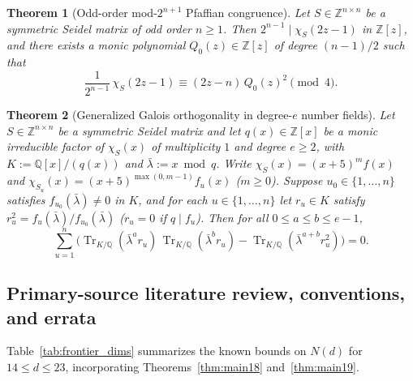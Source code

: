 \documentclass[11pt,reqno]{amsart}
\newtheorem{theorem}{Theorem}[section]
\theoremstyle{definition}
\theoremstyle{remark}
\numberwithin{equation}{section}
\numberwithin{table}{section}
\DeclareMathOperator{\Tr}{Tr}
\begin{document}
\begin{theorem}[Odd-order mod-$2^{n+1}$ Pfaffian congruence]\label{thm:pfaffian}
Let $S \in \mathbb{Z}^{n \times n}$ be a symmetric Seidel matrix of odd order $n \ge 1$. Then $2^{n-1} \mid \chi_S(2z - 1)$ in $\mathbb{Z}[z]$, and there exists a monic polynomial $Q_0(z) \in \mathbb{Z}[z]$ of degree $(n - 1)/2$ such that
\begin{equation}\label{eq:intro_pfaffian}
  \frac{1}{2^{n-1}}\,\chi_S(2z - 1) \equiv (2z - n)\,Q_0(z)^2 \pmod{4}.
\end{equation}
\end{theorem}

\begin{theorem}[Generalized Galois orthogonality in degree-$e$ number fields]\label{thm:galois_intro}
Let $S \in \mathbb{Z}^{n \times n}$ be a symmetric Seidel matrix and let $q(x) \in \mathbb{Z}[x]$ be a monic irreducible factor of $\chi_S(x)$ of multiplicity $1$ and degree $e \ge 2$, with $K := \mathbb{Q}[x]/(q(x))$ and $\bar{\lambda} := x \bmod q$. Write $\chi_S(x) = (x+5)^m f(x)$ and $\chi_{S_u}(x) = (x+5)^{\max(0, m-1)} f_u(x)$ ($m \ge 0$). Suppose $u_0 \in \{1, \dots, n\}$ satisfies $f_{u_0}(\bar{\lambda}) \neq 0$ in $K$, and for each $u \in \{1, \dots, n\}$ let $r_u \in K$ satisfy $r_u^2 = f_u(\bar{\lambda})/f_{u_0}(\bar{\lambda})$ ($r_u = 0$ if $q \mid f_u$). Then for all $0 \le a \le b \le e - 1$,
\begin{equation}\label{eq:intro_galois}
  \sum_{u=1}^n \Big(\Tr_{K/\mathbb{Q}}(\bar{\lambda}^a r_u)\,\Tr_{K/\mathbb{Q}}(\bar{\lambda}^b r_u) - \Tr_{K/\mathbb{Q}}(\bar{\lambda}^{a+b} r_u^2)\Big) = 0.
\end{equation}
\end{theorem}

\subsection{Primary-source literature review, conventions, and errata}\label{subsec:lit_review}
Table~\ref{tab:frontier_dims} summarizes the known bounds on $N(d)$ for $14 \le d \le 23$, incorporating Theorems~\ref{thm:main18} and~\ref{thm:main19}.
\end{document}
